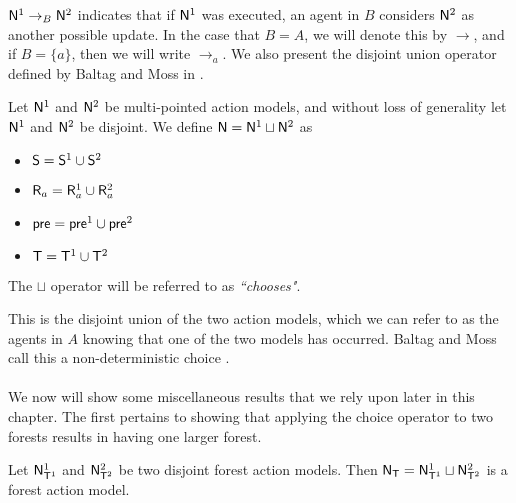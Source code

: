 $\mathrm{\mathsf{N}}^1 \to_B \mathrm{\mathsf{N}}^2$ indicates that if $\mathrm{\mathsf{N}}^1$ was executed, an agent in $B$ considers $\mathrm{\mathsf{N}}^2$ as another
possible update.
In the case that $B = A$, we will denote this by $\to$, and if $B = \{a\}$, then
we will write $\to_a$.
We also present the disjoint union operator defined by Baltag and Moss in \cite{baltag2005programs}.

\begin{defn} \label{disjoint}
Let $\mathrm{\mathsf{N}}^1$ and $\mathrm{\mathsf{N}}^2$ be multi-pointed action models, and without loss of generality let $\mathrm{\mathsf{N}}^1$ and
$\mathrm{\mathsf{N}}^2$ be disjoint.
We define $\mathrm{\mathsf{N}} = \mathrm{\mathsf{N}}^1 \sqcup \mathrm{\mathsf{N}}^2$ as
\begin{itemize}
	\item $\mathrm{\mathsf{S}} = \mathrm{\mathsf{S}}^1 \cup \mathrm{\mathsf{S}}^2$
	\item $\mathrm{\mathsf{R}}_a = \mathrm{\mathsf{R}}^1_a \cup \mathrm{\mathsf{R}}^2_a$
	\item $\mathrm{\mathsf{pre}} = \mathrm{\mathsf{pre}}^1 \cup \mathrm{\mathsf{pre}}^2$
	\item $\mathrm{\mathsf{T}} = \mathrm{\mathsf{T}}^1 \cup \mathrm{\mathsf{T}}^2$
\end{itemize}
The $\sqcup$ operator will be referred to as {\em ``chooses"}.
\end{defn}

This is the disjoint union of the two action models, which we can refer to as the agents in $A$
knowing that one of the two models has occurred.
Baltag and Moss call this a non-deterministic choice \cite{baltag2005programs}.\\
\\
We now will show some miscellaneous results that we rely upon later in this chapter.
The first pertains to showing that applying the choice operator to two forests results in having one
larger forest.

\begin{lemma} \label{disjForestIsForest}
Let $\mathrm{\mathsf{N}}^1_{\mathrm{\mathsf{T}}^1}$ and $\mathrm{\mathsf{N}}^2_{\mathrm{\mathsf{T}}^2}$ be two disjoint forest action models.
Then $\mathrm{\mathsf{N}}_\mathrm{\mathsf{T}} = \mathrm{\mathsf{N}}^1_{\mathrm{\mathsf{T}}^1} \sqcup \mathrm{\mathsf{N}}^2_{\mathrm{\mathsf{T}}^2}$ is a forest action model.
\end{lemma}

